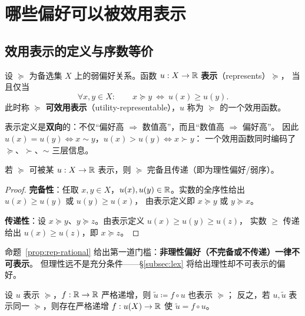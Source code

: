 \section{哪些偏好可以被效用表示}

\subsection{效用表示的定义与序数等价}

\begin{definition}[效用表示（回顾 \S2.2）]\label{def:rep}
设 $\succeq$ 为备选集 $X$ 上的弱偏好关系。函数 $u:X\to\mathbb{R}$ \textbf{表示}（represents）$\succeq$，
当且仅当
\[
\forall x,y\in X:\qquad x\succeq y\ \Longleftrightarrow\ u(x)\ge u(y).
\]
此时称 $\succeq$ \textbf{可效用表示}（utility-representable），$u$ 称为 $\succeq$ 的一个效用函数。
\end{definition}

表示定义是\textbf{双向}的：不仅“偏好高 $\Rightarrow$ 数值高”，而且“数值高 $\Rightarrow$ 偏好高”。
因此 $u(x)=u(y)\iff x\sim y$，$u(x)>u(y)\iff x\succ y$：
一个效用函数同时编码了 $\succeq$、$\succ$、$\sim$ 三层信息。

\begin{proposition}\label{prop:rep-rational}
若 $\succeq$ 可被某 $u:X\to\mathbb{R}$ 表示，则 $\succeq$ 完备且传递（即为理性偏好/弱序）。
\end{proposition}

\begin{proof}
\textbf{完备性}：任取 $x,y\in X$，$u(x),u(y)\in\mathbb{R}$。实数的全序性给出 $u(x)\ge u(y)$ 或 $u(y)\ge u(x)$，
由表示定义即 $x\succeq y$ 或 $y\succeq x$。

\textbf{传递性}：设 $x\succeq y$、$y\succeq z$。由表示定义 $u(x)\ge u(y)\ge u(z)$，
实数 $\ge$ 传递给出 $u(x)\ge u(z)$，即 $x\succeq z$。
\end{proof}

命题~\ref{prop:rep-rational} 给出第一道门槛：\textbf{非理性偏好（不完备或不传递）一律不可表示}。
但理性远不是充分条件——§\ref{subsec:lex} 将给出理性却不可表示的偏好。

\begin{proposition}\label{prop:ordinal}
设 $u$ 表示 $\succeq$，$f:\mathbb{R}\to\mathbb{R}$ 严格递增，则 $\tilde u\coloneqq f\circ u$ 也表示 $\succeq$；
反之，若 $u,\tilde u$ 表示同一 $\succeq$，则存在严格递增 $f:u(X)\to\mathbb{R}$ 使 $\tilde u=f\circ u$。
\end{proposition}

